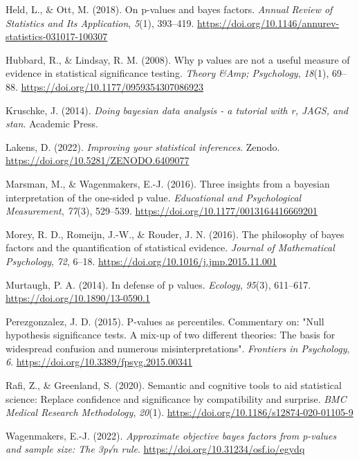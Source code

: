 \documentclass[
  man,
  floatsintext,
  longtable,
  nolmodern,
  notxfonts,
  notimes,
  colorlinks=true,linkcolor=blue,citecolor=blue,urlcolor=blue]{apa7}
\newlength{\cslhangindent}
\newenvironment{CSLReferences}[2] %
 {\begin{list}{}{%
  \setlength{\itemindent}{0pt}
  \setlength{\leftmargin}{0pt}
  \setlength{\parsep}{0pt}
  \ifodd #1
   \setlength{\leftmargin}{\cslhangindent}
   \setlength{\itemindent}{-1\cslhangindent}
  \fi
  \setlength{\itemsep}{#2\baselineskip}}}
 {\end{list}}
\begin{document}
\begin{CSLReferences}{1}{0}
Held, L., \& Ott, M. (2018). On p-values and bayes factors. \emph{Annual
Review of Statistics and Its Application}, \emph{5}(1), 393--419.
\url{https://doi.org/10.1146/annurev-statistics-031017-100307}

Hubbard, R., \& Lindsay, R. M. (2008). Why p values are not a useful
measure of evidence in statistical significance testing. \emph{Theory
\&Amp; Psychology}, \emph{18}(1), 69--88.
\url{https://doi.org/10.1177/0959354307086923}

Kruschke, J. (2014). \emph{Doing bayesian data analysis - a tutorial
with r, JAGS, and stan}. Academic Press.

Lakens, D. (2022). \emph{Improving your statistical inferences}. Zenodo.
\url{https://doi.org/10.5281/ZENODO.6409077}

Marsman, M., \& Wagenmakers, E.-J. (2016). Three insights from a
bayesian interpretation of the one-sided p value. \emph{Educational and
Psychological Measurement}, \emph{77}(3), 529--539.
\url{https://doi.org/10.1177/0013164416669201}

Morey, R. D., Romeijn, J.-W., \& Rouder, J. N. (2016). The philosophy of
bayes factors and the quantification of statistical evidence.
\emph{Journal of Mathematical Psychology}, \emph{72}, 6--18.
\url{https://doi.org/10.1016/j.jmp.2015.11.001}

Murtaugh, P. A. (2014). In defense of p values. \emph{Ecology},
\emph{95}(3), 611--617. \url{https://doi.org/10.1890/13-0590.1}

Perezgonzalez, J. D. (2015). P-values as percentiles. Commentary on:
"Null hypothesis significance tests. A mix-up of two different theories:
The basis for widespread confusion and numerous misinterpretations".
\emph{Frontiers in Psychology}, \emph{6}.
\url{https://doi.org/10.3389/fpsyg.2015.00341}

Rafi, Z., \& Greenland, S. (2020). Semantic and cognitive tools to aid
statistical science: Replace confidence and significance by
compatibility and surprise. \emph{BMC Medical Research Methodology},
\emph{20}(1). \url{https://doi.org/10.1186/s12874-020-01105-9}

Wagenmakers, E.-J. (2022). \emph{Approximate objective bayes factors
from p-values and sample size: The 3p√n rule}.
\url{https://doi.org/10.31234/osf.io/egydq}


\end{CSLReferences}
\end{document}
